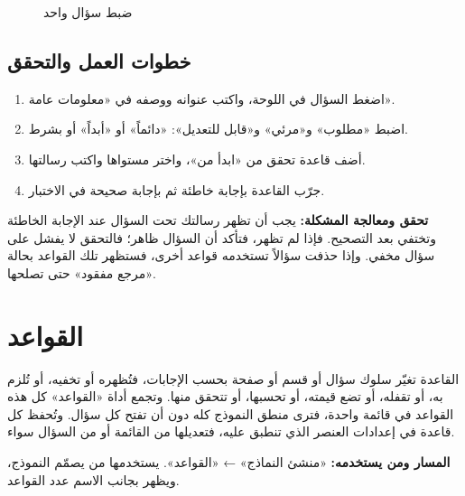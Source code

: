 \begin{figure}[H]
\centering
{}
\rclegend
\caption{ضبط سؤال واحد}
\label{fig:builder-forms-field-settings-flow}
\end{figure}

\subsection{خطوات العمل والتحقق}
\begin{enumerate}
\item اضغط السؤال في اللوحة، واكتب عنوانه ووصفه في «معلومات عامة».
\item اضبط «مطلوب» و«مرئي» و«قابل للتعديل»: «دائماً» أو «أبداً» أو بشرط.
\item أضف قاعدة تحقق من «ابدأ من»، واختر مستواها واكتب رسالتها.
\item جرّب القاعدة بإجابة خاطئة ثم بإجابة صحيحة في الاختبار.
\end{enumerate}

\textbf{تحقق ومعالجة المشكلة:} يجب أن تظهر رسالتك تحت السؤال عند الإجابة الخاطئة وتختفي بعد التصحيح. فإذا لم تظهر، فتأكد أن السؤال ظاهر؛ فالتحقق لا يفشل على سؤال مخفي. وإذا حذفت سؤالاً تستخدمه قواعد أخرى، فستظهر تلك القواعد بحالة «مرجع مفقود» حتى تصلحها.

\clearpage
\section{القواعد}
\label{sec:builder-feature-forms-rules}

القاعدة تغيّر سلوك سؤال أو قسم أو صفحة بحسب الإجابات، فتُظهره أو تخفيه، أو تُلزم به، أو تقفله، أو تضع قيمته، أو تحسبها، أو تتحقق منها. وتجمع أداة «القواعد» كل هذه القواعد في قائمة واحدة، فترى منطق النموذج كله دون أن تفتح كل سؤال. وتُحفظ كل قاعدة في إعدادات العنصر الذي تنطبق عليه، فتعديلها من القائمة أو من السؤال سواء.

\textbf{المسار ومن يستخدمه:} «منشئ النماذج» ← «القواعد». يستخدمها من يصمّم النموذج، ويظهر بجانب الاسم عدد القواعد.

